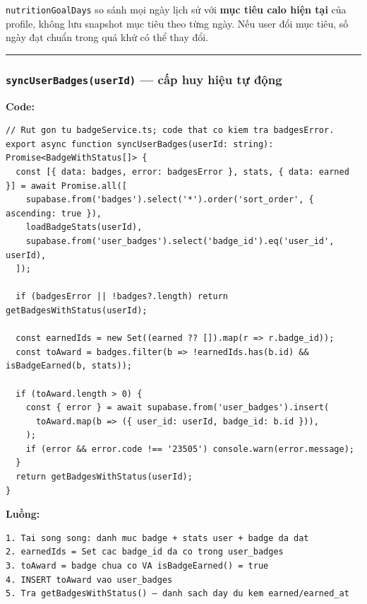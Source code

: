 \documentclass[12pt,a4paper]{article}
\providecommand{\passthrough}[1]{#1}
\begin{document}
\passthrough{\lstinline!nutritionGoalDays!} so sánh mọi ngày lịch sử với
\textbf{mục tiêu calo hiện tại} của profile, không lưu snapshot mục tiêu
theo từng ngày. Nếu user đổi mục tiêu, số ngày đạt chuẩn trong quá khứ
có thể thay đổi.

\begin{center}\rule{0.5\linewidth}{0.5pt}\end{center}

\subsubsection{\texorpdfstring{\texttt{syncUserBadges(userId)} --- cấp
huy hiệu tự
động}{syncUserBadges(userId) --- cấp huy hiệu tự động}}\label{syncuserbadgesuserid-cux1ea5p-huy-hiux1ec7u-tux1ef1-ux111ux1ed9ng}

\textbf{Code:}

\begin{lstlisting}
// Rut gon tu badgeService.ts; code that co kiem tra badgesError.
export async function syncUserBadges(userId: string): Promise<BadgeWithStatus[]> {
  const [{ data: badges, error: badgesError }, stats, { data: earned }] = await Promise.all([
    supabase.from('badges').select('*').order('sort_order', { ascending: true }),
    loadBadgeStats(userId),
    supabase.from('user_badges').select('badge_id').eq('user_id', userId),
  ]);

  if (badgesError || !badges?.length) return getBadgesWithStatus(userId);

  const earnedIds = new Set((earned ?? []).map(r => r.badge_id));
  const toAward = badges.filter(b => !earnedIds.has(b.id) && isBadgeEarned(b, stats));

  if (toAward.length > 0) {
    const { error } = await supabase.from('user_badges').insert(
      toAward.map(b => ({ user_id: userId, badge_id: b.id })),
    );
    if (error && error.code !== '23505') console.warn(error.message);
  }
  return getBadgesWithStatus(userId);
}

\end{lstlisting}

\textbf{Luồng:}

\begin{lstlisting}
1. Tai song song: danh muc badge + stats user + badge da dat
2. earnedIds = Set cac badge_id da co trong user_badges
3. toAward = badge chua co VA isBadgeEarned() = true
4. INSERT toAward vao user_badges
5. Tra getBadgesWithStatus() — danh sach day du kem earned/earned_at
\end{lstlisting}
\end{document}
